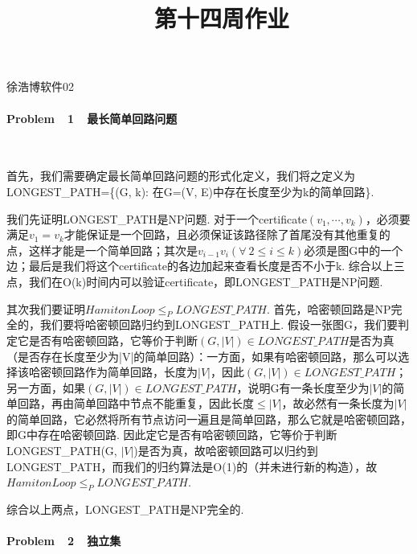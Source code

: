 \documentclass[UTF8]{ctexart}
\begin{document}
\renewcommand{\thefootnote}{\fnsymbol{footnote}}
\linespread{1.4}
\title{\vspace{-5em}\ \ 第十四周作业\vspace{-2.5em}}
\date{}
\maketitle
\begin{center}
{\fangsong 徐浩博\quad 软件02}
\end{center}

\paragraph*{Problem\ \ 1\ \ 最长简单回路问题}\ \par
首先，我们需要确定最长简单回路问题的形式化定义，我们将之定义为LONGEST\_PATH=\{(G, k): 在G=(V, E)中存在长度至少为k的简单回路\}.\par
我们先证明LONGEST\_PATH是NP问题. 对于一个certificate$(v_1, \cdots ,v_k)$，必须要满足$v_1=v_k$才能保证是一个回路，且必须保证该路径除了首尾没有其他重复的点，这样才能是一个简单回路；其次是$v_{i-1}v_i(\forall\ 2\le i \le k)$必须是图G中的一个边；最后是我们将这个certificate的各边加起来查看长度是否不小于k. 综合以上三点，我们在O(k)时间内可以验证certificate，即LONGEST\_PATH是NP问题.\par
其次我们要证明$HamitonLoop\le_P LONGEST\_PATH$. 首先，哈密顿回路是NP完全的，我们要将哈密顿回路归约到LONGEST\_PATH上. 假设一张图G，我们要判定它是否有哈密顿回路，它等价于判断$(G, |V|)\in LONGEST\_PATH$是否为真（是否存在长度至少为|V|的简单回路）：一方面，如果有哈密顿回路，那么可以选择该哈密顿回路作为简单回路，长度为$|V|$，因此$(G, |V|)\in LONGEST\_PATH$；另一方面，如果$(G, |V|)\in LONGEST\_PATH$，说明G有一条长度至少为$|V|$的简单回路，再由简单回路中节点不能重复，因此长度$\le$$|V|$，故必然有一条长度为$|V|$的简单回路，它必然将所有节点访问一遍且是简单回路，那么它就是哈密顿回路，即G中存在哈密顿回路. 因此定它是否有哈密顿回路，它等价于判断LONGEST\_PATH(G, $|V|$)是否为真，故哈密顿回路可以归约到LONGEST\_PATH，而我们的归约算法是O(1)的（并未进行新的构造），故$HamitonLoop\le_P LONGEST\_PATH$.\par
综合以上两点，LONGEST\_PATH是NP完全的.

\paragraph*{Problem\ \ 2\ \ 独立集}\ \par
\end{document}
